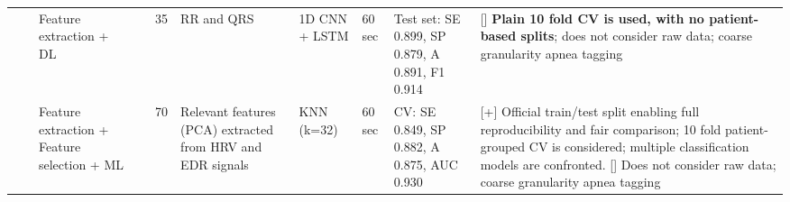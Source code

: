 \documentclass[5p,twocolumn,lefttitle]{elsarticle}
\begin{document}
\begin{table*}[!ht]
{\begin{tabularx}{2\textwidth}{@{}m{2.5em}p{7em}p{10em}lp{2em}p{12em}p{7em}p{3em}p{17em}X@{}}
                            &                                                         & Feature extraction + DL                                        & \cite{almutairi2020detection}            & 35            & RR and QRS                                                                                                        & 1D CNN + LSTM                       & 60 sec                                     & Test set: SE 0.899, SP 0.879, A 0.891, F1 0.914                                                                                                                                      & [] \textbf{Plain 10 fold CV is used, with no patient-based splits}; does not consider raw data; coarse granularity apnea tagging                                                                                                                                                                                                                                                                                                                            \\
                            \cmidrule(l){3-10} 
                            &                                                         & Feature extraction + Feature selection + ML                    & \cite{sharma2020sleep}                   & 70            & Relevant features (PCA) extracted from HRV and EDR signals                                                         & KNN (k=32)                          & 60 sec                                     & CV: SE 0.849, SP 0.882, A 0.875, AUC 0.930                                                                                                                                               & [+] Official train/test split enabling full reproducibility and fair comparison; 10 fold patient-grouped CV is considered; multiple classification models are confronted. [] Does not consider raw data; coarse granularity apnea tagging                                                                                                                                                                                                                                                                                           \\
                            \cmidrule(l){3-10} 

\end{tabularx}}
\end{table*}
\end{document}
